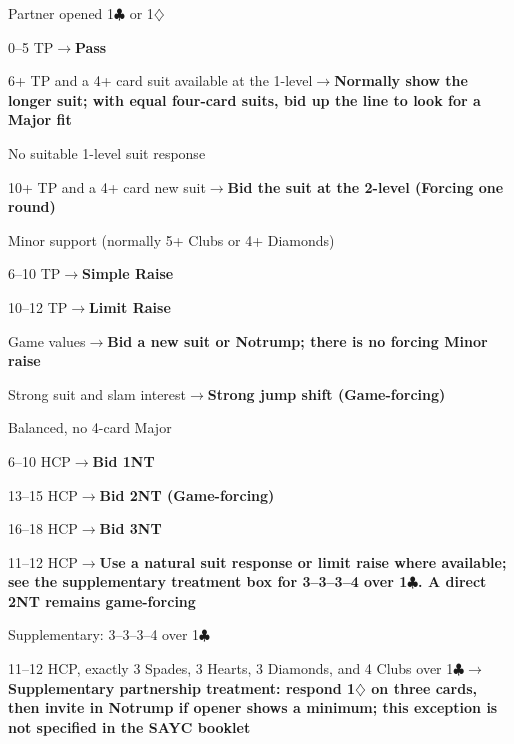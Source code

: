 \documentclass[10pt,letterpaper]{article}
\newcommand{\C}{\ensuremath{\clubsuit}}
\newcommand{\D}{\ensuremath{\diamondsuit}}
\begin{document}
\begin{minipage}[t]{0.485\textwidth}\vspace{0pt}

\begin{guidecard}{Partner opened 1\C{} or 1\D{}}
\begin{branches}
\item 0--5 TP\;\ensuremath{\longrightarrow}\;\textbf{Pass}
\item 6+ TP and a 4+ card suit available at the 1-level\;\ensuremath{\longrightarrow}\;\textbf{Normally show the longer suit; with equal four-card suits, bid up the line to look for a Major fit}
\item No suitable 1-level suit response
\begin{branches}
\item 10+ TP and a 4+ card new suit\;\ensuremath{\longrightarrow}\;\textbf{Bid the suit at the 2-level (Forcing one round)}
\item Minor support (normally 5+ Clubs or 4+ Diamonds)
\begin{branches}
\item 6--10 TP\;\ensuremath{\longrightarrow}\;\textbf{Simple Raise}
\item 10--12 TP\;\ensuremath{\longrightarrow}\;\textbf{Limit Raise}
\item Game values\;\ensuremath{\longrightarrow}\;\textbf{Bid a new suit or Notrump; there is no forcing Minor raise}
\end{branches}
\item Strong suit and slam interest\;\ensuremath{\longrightarrow}\;\textbf{Strong jump shift (Game-forcing)}
\item Balanced, no 4-card Major
\begin{branches}
\item 6--10 HCP\;\ensuremath{\longrightarrow}\;\textbf{Bid 1NT}
\item 13--15 HCP\;\ensuremath{\longrightarrow}\;\textbf{Bid 2NT (Game-forcing)}
\item 16--18 HCP\;\ensuremath{\longrightarrow}\;\textbf{Bid 3NT}
\item 11--12 HCP\;\ensuremath{\longrightarrow}\;\textbf{Use a natural suit response or limit raise where available; see the supplementary treatment box for 3--3--3--4 over 1\C{}. A direct 2NT remains game-forcing}
\end{branches}
\end{branches}
\end{branches}
\end{guidecard}

\begin{guidecard}{Supplementary: 3--3--3--4 over 1\C{}}
\begin{branches}
\item 11--12 HCP, exactly 3 Spades, 3 Hearts, 3 Diamonds, and 4 Clubs over 1\C{}\;\ensuremath{\longrightarrow}\;\textbf{Supplementary partnership treatment: respond 1\D{} on three cards, then invite in Notrump if opener shows a minimum; this exception is not specified in the SAYC booklet}
\end{branches}
\end{guidecard}

\end{minipage}
\end{document}

